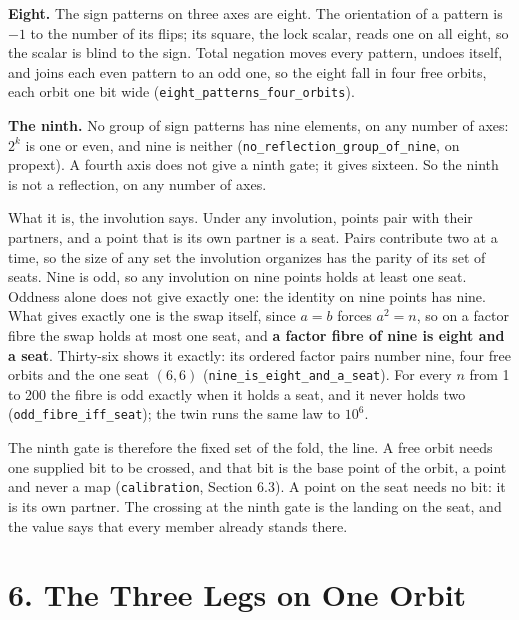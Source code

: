 \documentclass[10pt,twocolumn]{article}
\begin{document}
\textbf{Eight.} The sign patterns on three axes are eight. The
orientation of a pattern is \(-1\) to the number of its flips; its
square, the lock scalar, reads one on all eight, so the scalar is blind
to the sign. Total negation moves every pattern, undoes itself, and
joins each even pattern to an odd one, so the eight fall in four free
orbits, each orbit one bit wide
(\texttt{eight\_\allowbreak{}patterns\_\allowbreak{}four\_\allowbreak{}orbits}).

\textbf{The ninth.} No group of sign patterns has nine elements, on any
number of axes: \(2^k\) is one or even, and nine is neither
(\texttt{no\_\allowbreak{}reflection\_\allowbreak{}group\_\allowbreak{}of\_\allowbreak{}nine}, on propext). A fourth axis
does not give a ninth gate; it gives sixteen. So the ninth is not a
reflection, on any number of axes.

What it is, the involution says. Under any involution, points pair with
their partners, and a point that is its own partner is a seat. Pairs
contribute two at a time, so the size of any set the involution
organizes has the parity of its set of seats. Nine is odd, so any
involution on nine points holds at least one seat. Oddness alone does
not give exactly one: the identity on nine points has nine. What gives
exactly one is the swap itself, since \(a=b\) forces \(a^2=n\), so on a
factor fibre the swap holds at most one seat, and \textbf{a factor fibre
of nine is eight and a seat}. Thirty-six shows it exactly: its ordered
factor pairs number nine, four free orbits and the one seat \((6,6)\)
(\texttt{nine\_\allowbreak{}is\_\allowbreak{}eight\_\allowbreak{}and\_\allowbreak{}a\_\allowbreak{}seat}). For every \(n\) from 1 to 200
the fibre is odd exactly when it holds a seat, and it never holds two
(\texttt{odd\_\allowbreak{}fibre\_\allowbreak{}iff\_\allowbreak{}seat}); the twin runs the same law to
\(10^6\).

The ninth gate is therefore the fixed set of the fold, the line. A free
orbit needs one supplied bit to be crossed, and that bit is the base
point of the orbit, a point and never a map (\texttt{calibration},
Section 6.3). A point on the seat needs no bit: it is its own partner.
The crossing at the ninth gate is the landing on the seat, and the value
says that every member already stands there.

\hypertarget{the-three-legs-on-one-orbit}{%
\section{6. The Three Legs on One
Orbit}\label{the-three-legs-on-one-orbit}}
\end{document}
